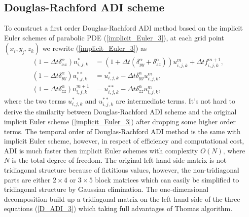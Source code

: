 \documentclass[dissertation]{uathesis}
\begin{document}
\begin{body}
\subsection{Douglas-Rachford ADI scheme}
To construct a first order Douglas-Rachford ADI method \cite{douglas1955numerical2, paeceman1955numerical} based on the implicit Euler schemes of parabolic PDE (\ref{implicit_Euler_3}), at each grid point $(x_i, y_j, z_k)$ we rewrite (\ref{implicit_Euler_3}) as
%
\begin{align} \label{D_ADI_3}
(1-\Delta t \delta^{\alpha}_{xx}) u^{*}_{i,j,k}   &= (1 + \Delta t (\delta^{\alpha}_{yy} + \delta^{\alpha}_{zz})) u^{m}_{i,j,k} + \Delta t f^{m+1}_{i,j,k}, \nonumber \\
(1-\Delta t \delta^{\alpha}_{yy}) u^{**}_{i,j,k}  &= u^{*}_{i,j,k} - \Delta t \delta^{\alpha}_{yy} u^{m}_{i,j,k},  \\
(1-\Delta t \delta^{\alpha}_{zz}) u^{m+1}_{i,j,k} &= u^{**}_{i,j,k} - \Delta t \delta^{\alpha}_{zz} u^{m}_{i,j,k}, \nonumber
\end{align}
%
where the two terms $u^{*}_{i,j,k}$ and $u^{**}_{i,j,k}$ are intermediate terms. It's not hard to derive the similarity between Douglas-Rachford ADI scheme and the original implicit Euler scheme (\ref{implicit_Euler_3}) after dropping some higher order terms. The temporal order of Douglas-Rachford ADI method is the same with implicit Euler scheme, however, in respect of efficiency and computational cost, ADI is much faster then implicit Euler schemes with complexity $O(N)$, where $N$ is the total degree of freedom. The original left hand side matrix is not tridiagonal structure because of fictitious values, however, the non-tridiagonal parts are either 
$2\times4$ or $3\times5$ block matrices which can easily be simplified to tridiagonal structure by Gaussian elimination. The one-dimensional decomposition build up a tridiagonal matrix on the left hand side of the three equations (\ref{D_ADI_3}) which taking full advantages of Thomas algorithm. 


\end{body}
\end{document}
